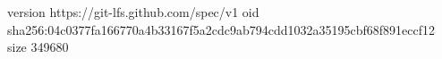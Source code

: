 version https://git-lfs.github.com/spec/v1
oid sha256:04c0377fa166770a4b33167f5a2cdc9ab794cdd1032a35195cbf68f891eccf12
size 349680
